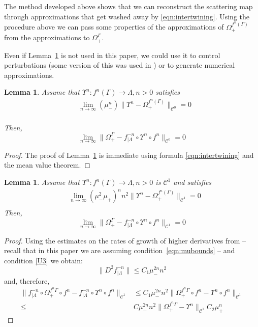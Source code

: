 \documentclass[11pt]{amsart}
\newtheorem{lem}[thm]{Lemma}
\theoremstyle{definition}
\theoremstyle{remark}
\numberwithin{equation}{section}
\newcommand{\C}{\mathcal{C}}
\begin{document}
The method developed above
shows that  we can reconstruct the scattering
map through approximations that get washed away by \eqref{eqn:intertwining}.
Using the procedure above we can pass some properties of the
approximations of $\Omega_+ ^{f^n(\Gamma)}$ from the approximations to $\Omega_+^\Gamma$.

Even if Lemma~\ref{lem:basic} is  not used in this paper, we could use
it  to control perturbations (some version of
this was used in \cite{GideaLM21}) or to
generate numerical approximations.

\begin{lem}  \label{lem:basic}
  Assume that $\Upsilon^n: f^n(\Gamma) \rightarrow \Lambda, n> 0$
  satisfies
  \[
  \begin{split}
    &\lim_{n \to \infty}
(\mu_-^{n} )    \| \Upsilon^n -\Omega_+^{ f^n(\Gamma)} \|_{\C^0}  = 0 \\
    \end{split}
  \]


Then,
  \[
  \lim_{n \to \infty}
  \| \Omega_+^\Gamma - f_{\mid\Lambda}^{-n}\circ\Upsilon^n  \circ f^n \|_{\C^0} = 0
  \]
\end{lem}


\begin{proof}
  The proof of  Lemma~\ref{lem:basic} is immediate using  formula \eqref{eqn:intertwining} and the
  mean value theorem.
\end{proof}


\begin{lem}  \label{lem:basic2}
  Assume that $\Upsilon^n: f^n(\Gamma) \rightarrow \Lambda, n> 0$ is $\C ^1$ and
  satisfies
  \[
  \begin{split}
    &\lim_{n \to \infty}
  (\mu_-^2 \mu_+)^n  n^2   \| \Upsilon^n -\Omega_+^{ f^n(\Gamma)} \|_{\C^1} = 0 \\
    \end{split}
  \]
Then,
  \[
  \lim_{n \to \infty}
  \| \Omega_+^\Gamma - f_{\mid\Lambda}^{-n}\circ\Upsilon^n  \circ f^n \|_{\C^1} = 0
  \]
\end{lem}

\begin{proof}
  Using the estimates on the rates of growth of higher derivatives from
  \cite[Proposition 15]{DLS08} -- recall that in this paper
  we are assuming condition~\eqref{eqn:mubounds} -- and condition \eqref{U3}
  we obtain:
  \[
  \| D^2 f_{\mid\Lambda}^{-n} \| \le C_1   \mu_- ^{2  n} n^2
  \]
  and, therefore,
  \[\begin{split}
  \| f_{\mid\Lambda}^{-n} \circ  \Omega_+^{f^n \Gamma} \circ f^n
  - f_{\mid\Lambda}^{-n}\circ\Upsilon^n  \circ f^n \|_{\C^1}
  &\le C_1 \mu_-^{2n} n^2 \|   \Omega_+^{f^n \Gamma} \circ f^n -
  \Upsilon^n  \circ f^n \|_{\C^1}\\ \le&
  C \mu_-^{2n} n^2 \|   \Omega_+^{f^n \Gamma} - \Upsilon^n \|_{\C^1}  C_2 \mu_+^n
  \end{split}\]
\end{proof}
\end{document}

